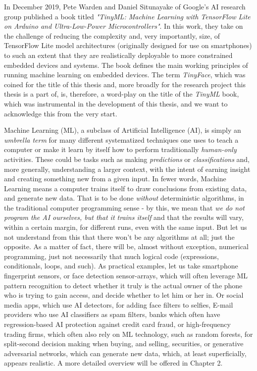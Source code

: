 In December 2019, Pete Warden and Daniel Situnayake of Google's AI research group published a book titled \textit{"TinyML: Machine Learning with TensorFlow Lite on Arduino and Ultra-Low-Power Microcontrollers"}. In this work, they take on the challenge of reducing the complexity and, very importantly, size, of TensorFlow Lite model architectures (originally designed for use on smartphones) to such an extent that they are realistically deployable to more constrained embedded devices and systems. The book defines the main working principles of running machine learning on embedded devices. \cite{tinyml_book} The term \textit{TinyFace}, which was coined for the title of this thesis and, more broadly for the research project this thesis is a part of, is, therefore, a word-play on the title of the \textit{TinyML} book, which was instrumental in the development of this thesis, and we want to acknowledge this from the very start. \par
Machine Learning (ML), a subclass of Artificial Intelligence (AI), is simply an \textit{umbrella term} for many different systematized techniques one uses to teach a computer or make it learn by itself how to perform traditionally \textit{human-only} activities. These could be tasks such as making \textit{predictions} or \textit{classifications} and, more generally, understanding a larger context, with the intent of earning insight and creating something new from a given input. In fewer words, Machine Learning means a computer trains itself to draw conclusions from existing data, and generate new data. That is to be done \textit{without} deterministic algorithms, in the traditional computer programming sense - by this, we mean that \textit{we do not program the AI ourselves, but that it trains itself} and that the results will vary, within a certain margin, for different runs, even with the same input. \cite{Goodfellow-et-al-2016} But let us not understand from this that there won't be any algorithms at all; just the opposite. As a matter of fact, there will be, almost without exception, numerical programming, just not necessarily that much logical code (expressions, conditionals, loops, and such). As practical examples, let us take smartphone fingerprint sensors, or face detection sensor-arrays, which will often leverage ML pattern recognition to detect whether it truly is the actual owner of the phone who is trying to gain access, and decide whether to let him or her in. Or social media apps, which use AI detectors, for adding face filters to selfies, E-mail providers who use AI classifiers as spam filters, banks which often have regression-based AI protection against credit card fraud, or high-frequency trading firms, which often also rely on ML technology, such as random forests, for split-second decision making when buying, and selling, securities, or generative adversarial networks, which can generate new data, which, at least superficially, appears realistic. \cite{gans_goodfellow} A more detailed overview will be offered in Chapter 2. \par
